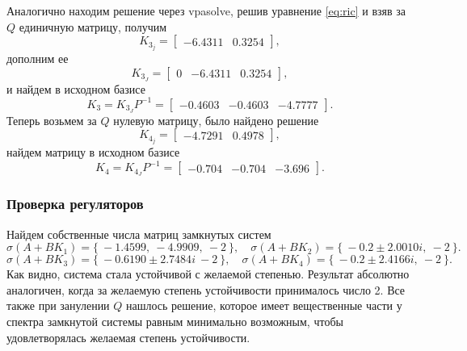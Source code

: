 Аналогично находим решение через vpasolve, решив уравнение \ref{eq:ric}
и взяв за $Q$ единичную матрицу, получим
\begin{equation*}
    K_{3_j}=\begin{bmatrix}
        -6.4311& 0.3254
    \end{bmatrix},
\end{equation*}
дополним ее
\begin{equation*}
    K_{3_J}=\begin{bmatrix}
        0&-6.4311& 0.3254
    \end{bmatrix},
\end{equation*}
и найдем в исходном базисе
\begin{equation*}
    K_3=K_{3_J}P^{-1}=\begin{bmatrix}
        -0.4603& -0.4603& -4.7777
    \end{bmatrix}.
\end{equation*}
Теперь возьмем за $Q$ нулевую матрицу, было найдено решение
\begin{equation*}
    K_{4_j}=\begin{bmatrix}
        -4.7291& 0.4978
    \end{bmatrix},
\end{equation*}
найдем матрицу в исходном базисе
\begin{equation*}
    K_4=K_{4_J}P^{-1}=\begin{bmatrix}
        -0.704& -0.704& -3.696
    \end{bmatrix}.
\end{equation*}


\subsubsection{Проверка регуляторов}

Найдем собственные числа матриц замкнутых систем
\begin{equation*}
    \sigma(A+BK_1)=\{\ -1.4599,\    -4.9909,\    -2\ \},\quad
    \sigma(A+BK_2)=\{\ -0.2 \pm 2.0010i,\ -2\ \}.
\end{equation*}
\begin{equation*}
    \sigma(A+BK_3)=\{\ -0.6190 \pm 2.7484i\  -2\ \},\quad
    \sigma(A+BK_4)=\{\ -0.2 \pm 2.4166i,\ -2\ \}.
\end{equation*}
Как видно, система стала устойчивой с желаемой степенью. Результат
абсолютно аналогичен, когда за желаемую степень устойчивости принималось число 2.
Все также при занулении $Q$ нашлось решение, которое имеет вещественные
части у спектра замкнутой системы равным минимально возможным, чтобы
удовлетворялась желаемая степень устойчивости.


